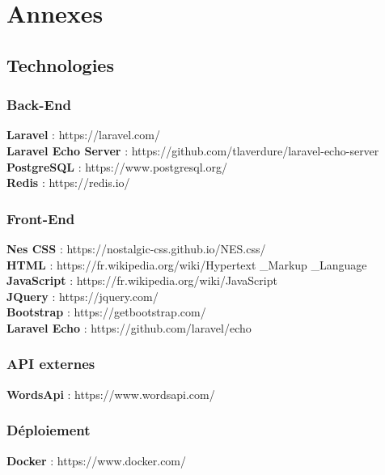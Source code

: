 \documentclass{tnreport}
\begin{document}
\appendix
\part*{Annexes}

\cleardoublepage

\chapter{Technologies}

\section{Back-End}
\textbf{Laravel} : https://laravel.com/\\
\textbf{Laravel Echo Server} : https://github.com/tlaverdure/laravel-echo-server\\
\textbf{PostgreSQL} : https://www.postgresql.org/\\
\textbf{Redis} : https://redis.io/\\

\section{Front-End}
\textbf{Nes CSS} : https://nostalgic-css.github.io/NES.css/\\
\textbf{HTML} : https://fr.wikipedia.org/wiki/Hypertext \_Markup \_Language\\
\textbf{JavaScript} : https://fr.wikipedia.org/wiki/JavaScript\\
\textbf{JQuery} : https://jquery.com/\\
\textbf{Bootstrap} : https://getbootstrap.com/\\
\textbf{Laravel Echo} : https://github.com/laravel/echo\\

\section{API externes}
\textbf{WordsApi} : https://www.wordsapi.com/\\

\section{Déploiement}
\textbf{Docker} : https://www.docker.com/\\


\cleardoublepage
\end{document}
